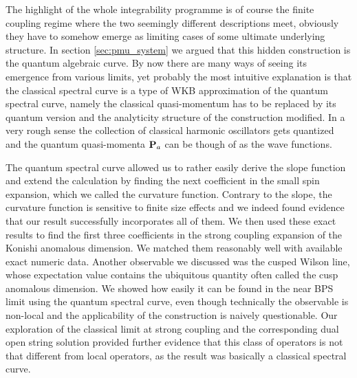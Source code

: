 The highlight of the whole integrability programme is of course the finite coupling regime where the two seemingly different descriptions meet, obviously they have to somehow emerge as limiting cases of some ultimate underlying structure.
In section \ref{sec:pmu_system} we argued that this hidden construction is the quantum algebraic curve. 
By now there are many ways of seeing its emergence from various limits, yet probably the most intuitive explanation is that the classical spectral curve is a type of WKB approximation of the quantum spectral curve, namely the classical quasi-momentum has to be replaced by its quantum version and the analyticity structure of the construction modified.
In a very rough sense the collection of classical harmonic oscillators gets quantized and the quantum quasi-momenta ${\bf P}_a$ can be though of as the wave functions. 

The quantum spectral curve allowed us to rather easily derive the slope function and extend the calculation by finding the next coefficient in the small spin expansion, which we called the curvature function.
Contrary to the slope, the curvature function is sensitive to finite size effects and we indeed found evidence that our result successfully incorporates all of them.
We then used these exact results to find the first three coefficients in the strong coupling expansion of the Konishi anomalous dimension.
We matched them reasonably well with available exact numeric data.
Another observable we discussed was the cusped Wilson line, whose expectation value contains the ubiquitous quantity often called the cusp anomalous dimension.
We showed how easily it can be found in the near BPS limit using the quantum spectral curve, even though technically the observable is non-local and the applicability of the construction is naively questionable.
Our exploration of the classical limit at strong coupling and the corresponding dual open string solution provided further evidence that this class of operators is not that different from local operators, as the result was basically a classical spectral curve.



